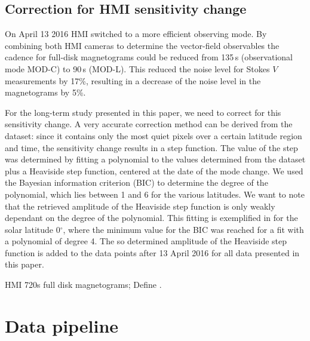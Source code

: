 \documentclass[twocolumn,linenumbers,trackchanges]{aastex631}
\begin{document}
\subsection{Correction for HMI sensitivity change}

On April 13 2016 HMI switched to a more efficient observing mode. By combining both HMI cameras to determine the vector-field observables the cadence for full-disk magnetograms could be reduced from 135\,s (observational mode MOD-C) to 90\,s (MOD-L). This reduced the noise level for Stokes $V$ measurements by 17\%, resulting in a decrease of the noise level in the \los{} magnetograms by 5\%.

For the long-term study presented in this paper, we need to correct for this sensitivity change. A very accurate correction method can be derived from the \IN{} dataset: since it contains only the most quiet pixels over a certain latitude region and time, the sensitivity change results in a step function. The value of the step was determined by fitting a polynomial to the \brms{} values determined from the \IN{} dataset plus a Heaviside step function, centered at the date of the mode change. We used the Bayesian information criterion (BIC) to determine the degree of the polynomial, which lies between 1 and 6 for the various latitudes. We want to note that the retrieved amplitude of the Heaviside step function is only weakly dependant on the degree of the polynomial. This fitting is exemplified in  for the solar latitude 0$^\circ$, where the minimum value for the BIC was reached for a fit with a polynomial of degree 4. The so determined amplitude of the Heaviside step function is added to the data points after 13 April 2016 for all data presented in this paper.



HMI 720s full disk magnetograms; 
Define \brms{}.

\section{Data pipeline}
\end{document}
